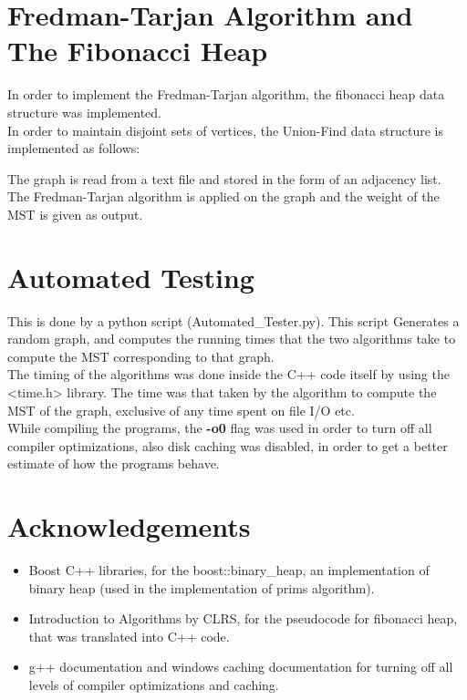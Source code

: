 \documentclass[]{article}
\begin{document}
\section{Fredman-Tarjan Algorithm and The Fibonacci Heap}
\begin{flushleft}
	In order to implement the Fredman-Tarjan algorithm, the fibonacci heap data structure was implemented.\\
		
	\vspace{10px}	
	In order to maintain disjoint sets of vertices, the Union-Find data structure is implemented as follows:
	

	The graph is read from a text file and stored in the form of an adjacency list. The Fredman-Tarjan algorithm is applied on the graph and the weight of the MST is given as output.
	
	


\end{flushleft} 

\section{Automated Testing}
\begin{flushleft}
	This is done by a python script (Automated\_Tester.py).
	This script Generates a random graph, and computes the running times that the two algorithms take to compute the MST corresponding to that graph.\\
	The timing of the algorithms was done inside the C++ code itself by using the <time.h> library. The time was that taken by the algorithm to compute the MST of the graph, exclusive of any time spent on file I/O etc.\\
	While compiling the programs, the \textbf{-o0} flag was used in order to turn off all compiler optimizations, also disk caching was disabled, in order to get a better estimate of how the programs behave.
	
	   
\end{flushleft}

\section{Acknowledgements}
\begin{flushleft}
\begin{itemize}
\item Boost C++ libraries, for the boost::binary\_heap, an implementation of binary heap (used in the implementation of prims algorithm).
\item Introduction to Algorithms by CLRS, for the pseudocode for fibonacci heap, that was translated into C++ code. 
\item g++ documentation and windows caching documentation for turning off all levels of compiler optimizations and caching.
\end{itemize}
\end{flushleft}
\end{document}
